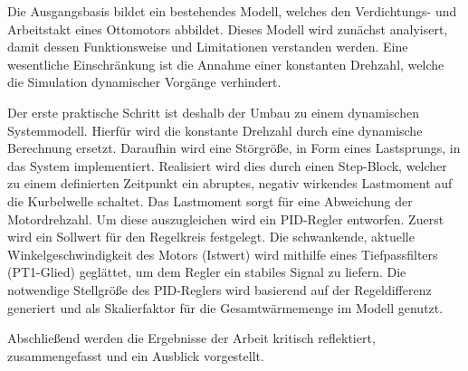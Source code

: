 Die Ausgangsbasis bildet ein bestehendes Modell, welches den Verdichtungs- und Arbeitstakt eines Ottomotors abbildet.
Dieses Modell wird zunächst analyisert, damit dessen Funktionsweise und Limitationen verstanden werden.
Eine wesentliche Einschränkung ist die Annahme einer konstanten Drehzahl, welche die Simulation dynamischer Vorgänge verhindert.

Der erste praktische Schritt ist deshalb der Umbau zu einem dynamischen Systemmodell.
Hierfür wird die konstante Drehzahl durch eine dynamische Berechnung ersetzt.
Daraufhin wird eine Störgröße, in Form eines Lastsprungs, in das System implementiert.
Realisiert wird dies durch einen Step-Block, welcher zu einem definierten Zeitpunkt ein abruptes, negativ wirkendes Lastmoment auf die Kurbelwelle schaltet.
Das Lastmoment sorgt für eine Abweichung der Motordrehzahl.
Um diese auszugleichen wird ein PID-Regler entworfen.
Zuerst wird ein Sollwert für den Regelkreis festgelegt.
Die schwankende, aktuelle Winkelgeschwindigkeit des Motors (Istwert) wird mithilfe eines Tiefpassfilters (PT1-Glied) geglättet, um dem Regler ein stabiles Signal zu liefern.
Die notwendige Stellgröße des PID-Reglers wird basierend auf der Regeldifferenz generiert und als Skalierfaktor für die Gesamtwärmemenge im Modell genutzt.

Abschließend werden die Ergebnisse der Arbeit kritisch reflektiert, zusammengefasst und ein Ausblick vorgestellt.